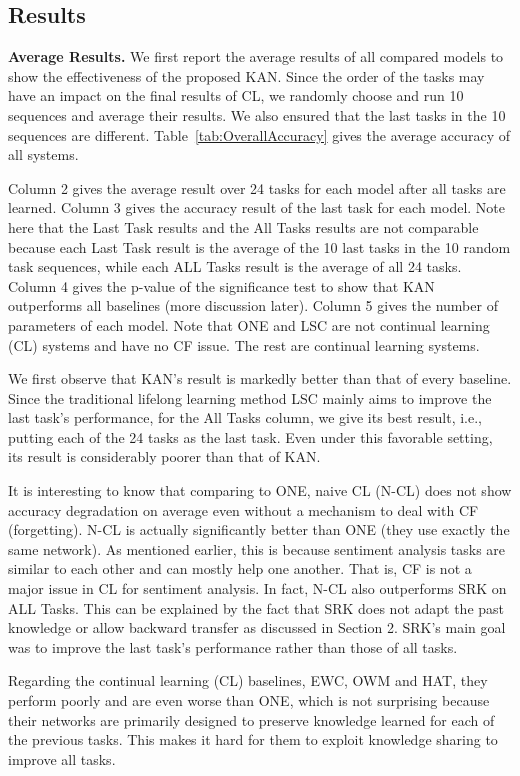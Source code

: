 \documentclass[runningheads]{llncs}
\begin{document}
\subsection{Results}
\label{sec:results}





\vspace{+4mm}
\noindent
\textbf{Average Results.} 
We first report the average results of all compared models to show the effectiveness of the proposed KAN. Since the order of the tasks may have an impact on the final results of CL, we randomly choose and run 10 sequences and average their results. We also ensured that the last tasks in the 10 sequences are different. 
Table~\ref{tab:OverallAccuracy} gives the average accuracy of all systems. {\color{black}Column 2 gives the average result over 24 tasks for each model after all tasks are learned. Column 3 gives the accuracy result of the last task for each model. Note here that the Last Task results and the All Tasks results are not comparable because each Last Task result is the average of the 10 last tasks in the 10 random task sequences, while each ALL Tasks result is the average of all 24 tasks. Column 4 gives the p-value of the significance test to show that KAN outperforms all baselines (more discussion later). Column 5 gives the number of parameters of each model. Note that ONE and LSC are not continual learning (CL) systems and have no CF issue. The rest are continual learning systems. 

We first observe that KAN's result is markedly better than that of every baseline. Since the traditional lifelong learning method LSC mainly aims to improve the last task's performance, for the All Tasks column, we give its best result, i.e., putting each of the 24 tasks as the last task. Even under this favorable setting, its result is considerably poorer than that of KAN. 





It is interesting to know that comparing to ONE, naive CL (N-CL) does not show accuracy degradation on average even without a mechanism to deal with CF (forgetting). N-CL is actually significantly better than ONE (they use exactly the same network). As mentioned earlier, this is because sentiment analysis tasks are similar to each other and can mostly help one another. That is, CF is not a major issue in CL for sentiment analysis. In fact, N-CL also outperforms SRK on ALL Tasks. This can be explained by the fact that SRK does not adapt the past knowledge or allow backward transfer as discussed in Section 2. SRK's main goal was to improve the last task's performance rather than those of all tasks. 
  
Regarding the continual learning (CL) baselines, EWC, OWM and HAT, they perform poorly and are even worse than ONE, which is not surprising because
their networks are primarily designed to preserve knowledge learned for each of the previous tasks. This makes it hard for them to exploit knowledge sharing to improve all tasks. 




}
\end{document}
